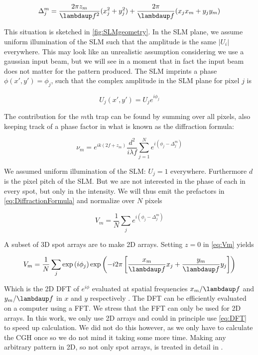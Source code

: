 \begin{equation}\label{eq:PropagationPhase}
    \Delta_j^m = \frac{2\pi z_m}{\lambdaup f^2}(x_j^2+y_j^2)+\frac{2\pi}{\lambdaup f}(x_j x_m +y_j y_m)
\end{equation}

This situation is sketched in \cref{fig:SLMgeometry}. In the SLM plane, we assume uniform illumination of the SLM such that the amplitude is the same $|U_i|$ everywhere. This may look like an unrealistic assumption considering we use a gaussian input beam, but we will see in a moment that in fact the input beam does not matter for the pattern produced. The SLM imprints a phase $\phi(x',y') = \phi_j$, such that the complex amplitude in the SLM plane for pixel $j$ is

\begin{equation}
    U_j(x',y') = U_j e^{i \phi_j}
\end{equation}

The contribution for the $m$th trap can be found by summing over all pixels, also keeping track of a phase factor in what is known as the diffraction formula:

\begin{equation}\label{eq:DiffractionFormula}
    \nu_m = e^{i k \left(2 f + z_m\right)}
    \frac{d^2}{i \lambda f} \sum_{j=1}^N e^{i(\phi_j - \Delta_j^m)}
\end{equation}

We assumed uniform illumination of the \ac{SLM}: $U_j =1$ everywhere. Furthermore $d$ is the pixel pitch of the SLM. But we are not interested in the phase of each in every spot, but only in the intensity. We will thus emit the prefactors in \cref{eq:DiffractionFormula} and normalize over $N$ pixels

\begin{equation}\label{eq:Vm}
    V_m = \frac{1}{N} \sum_{j} e^{i(\phi_j - \Delta_j^m)}
\end{equation}

A subset of 3D spot arrays are to make 2D arrays. Setting $z=0$ in \cref{eq:Vm} yields 

\begin{equation}\label{eq:2Dcase}
    V_m = \frac{1}{N} \sum_j \exp{\left(i\phi_j\right)} \exp{\left(
    - i 2\pi \left[
    \frac{x_m}{\lambdaup f} x_j + \frac{y_m}{\lambdaup f} y_j
    \right]
    \right)}
\end{equation}

Which is the 2D \ac{DFT} of $e^{i\phi}$ evaluated at spatial frequencies $x_m/\lambdaup f$ and $y_m/\lambdaup f$ in $x$ and $y$ respectively \cite{DiLeonardo2007,Bijnen2015}. The DFT can be efficiently evaluated on a computer using a \ac{FFT}. We stress that the FFT can only be used for 2D arrays. In this work, we only use 2D arrays and could in principle use \cref{eq:DFT} to speed up calculation. We did not do this however, as we only have to calculate the \ac{CGH} once so we do not mind it taking some more time. Making any arbitrary pattern in 2D, so not only spot arrays, is treated in detail in \cite{Bijnen2013}.  


